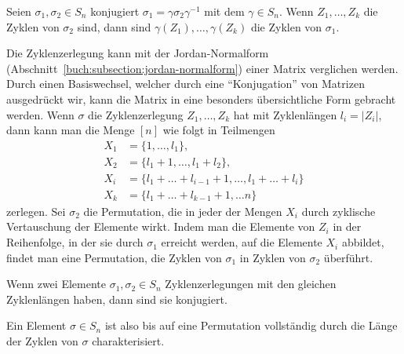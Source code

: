 \begin{satz}
Seien $\sigma_1,\sigma_2\in S_n$ konjugiert $\sigma_1=\gamma\sigma_2\gamma^{-1}$
mit dem $\gamma\in S_n$.
Wenn $Z_1,\dots,Z_k$ die Zyklen von $\sigma_2$ sind, dann sind 
$\gamma(Z_1),\dots,\gamma(Z_k)$ die Zyklen von $\sigma_1$.
\end{satz}

Die Zyklenzerlegung kann mit der Jordan-Normalform
%
(Abschnitt~\ref{buch:subsection:jordan-normalform})
einer Matrix verglichen werden.
Durch einen Basiswechsel, welcher durch eine ``Konjugation''
%
von Matrizen ausgedrückt wir, kann die Matrix in eine besonders 
übersichtliche Form gebracht werden.
Wenn $\sigma$ die Zyklenzerlegung $Z_1,\dots,Z_k$ hat mit Zyklenlängen
$l_i=|Z_i|$, dann kann man die Menge $[n]$ wie folgt in Teilmengen
\begin{align*}
X_1 &= \{1,\dots, l_1\},
\\
X_2 &= \{l_1+1,\dots,l_1+l_2\},
\\
X_i &= \{l_1+\dots+l_{i-1}+1,\dots, l_1+\dots+l_i\}
\\
X_k &= \{l_1+\dots+l_{k-1}+1,\dots n\}
\end{align*}
zerlegen.
Sei $\sigma_2$ die Permutation, die in jeder der Mengen $X_i$ durch
zyklische Vertauschung der Elemente wirkt.
Indem man die Elemente von $Z_i$ in der Reihenfolge, in der sie durch
$\sigma_1$ erreicht werden, auf die Elemente $X_i$ abbildet, findet
man eine Permutation, die Zyklen von $\sigma_1$ in Zyklen von $\sigma_2$
überführt.

\begin{satz}
Wenn zwei Elemente $\sigma_1,\sigma_2\in S_n$ Zyklenzerlegungen mit den
gleichen Zyklenlängen haben, dann sind sie konjugiert.
\end{satz}

Ein Element $\sigma\in S_n$ ist also bis auf eine Permutation
vollständig durch die Länge der Zyklen von $\sigma$ charakterisiert.


